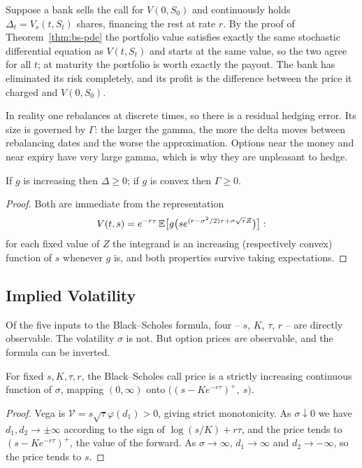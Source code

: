 \documentclass[a4paper]{scrartcl}
\begin{document}
\begin{remark}
	Suppose a bank sells the call for $V(0,S_0)$ and continuously holds $\Delta_t = V_s(t,S_t)$ shares, financing the rest at rate $r$. By the proof of Theorem~\ref{thm:bs-pde} the portfolio value satisfies exactly the same stochastic differential equation as $V(t,S_t)$ and starts at the same value, so the two agree for all $t$; at maturity the portfolio is worth exactly the payout. The bank has eliminated its risk completely, and its profit is the difference between the price it charged and $V(0,S_0)$.

	In reality one rebalances at discrete times, so there is a residual hedging error. Its size is governed by $\Gamma$: the larger the gamma, the more the delta moves between rebalancing dates and the worse the approximation. Options near the money and near expiry have very large gamma, which is why they are unpleasant to hedge.
\end{remark}

\begin{proposition}[Monotonicity]
	If $g$ is increasing then $\Delta \geq 0$; if $g$ is convex then $\Gamma \geq 0$.
\end{proposition}

\begin{proof}
	Both are immediate from the representation
	$$
	V(t,s) = e^{-r\tau}\,\mathbb{E}\big[g\big(se^{(r-\sigma^2/2)\tau+\sigma\sqrt\tau Z}\big)\big]:
	$$
	for each fixed value of $Z$ the integrand is an increasing (respectively convex) function of $s$ whenever $g$ is, and both properties survive taking expectations.
\end{proof}

\subsection{Implied Volatility}

Of the five inputs to the Black--Scholes formula, four -- $s$, $K$, $\tau$, $r$ -- are directly observable. The volatility $\sigma$ is not. But option prices \emph{are} observable, and the formula can be inverted.

\begin{proposition}
	For fixed $s,K,\tau,r$, the Black--Scholes call price is a strictly increasing continuous function of $\sigma$, mapping $(0,\infty)$ onto $\big((s - Ke^{-r\tau})^+,\ s\big)$.
\end{proposition}

\begin{proof}
	Vega is $\mathcal{V} = s\sqrt\tau\varphi(d_1) > 0$, giving strict monotonicity. As $\sigma\downarrow0$ we have $d_1,d_2\to\pm\infty$ according to the sign of $\log(s/K) + r\tau$, and the price tends to $(s-Ke^{-r\tau})^+$, the value of the forward. As $\sigma\to\infty$, $d_1\to\infty$ and $d_2\to-\infty$, so the price tends to $s$.
\end{proof}
\end{document}
